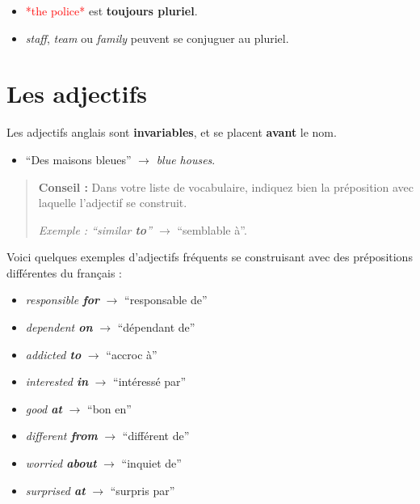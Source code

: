\documentclass[
  10pt,
]{article}
\providecommand{\tightlist}{%
  \setlength{\itemsep}{0pt}\setlength{\parskip}{0pt}}
\begin{document}
\begin{itemize}
\tightlist
\item
  \textcolor{red}{*the police*} est \textbf{toujours pluriel}.
\item
  \emph{staff}, \emph{team} ou \emph{family} peuvent se conjuguer au pluriel.
\end{itemize}

\hypertarget{les-adjectifs}{%
\section{Les adjectifs}\label{les-adjectifs}}

Les adjectifs anglais sont \textbf{invariables}, et se placent \textbf{avant} le nom.

\begin{itemize}
\tightlist
\item
  ``Des maisons bleues'' \(\rightarrow\) \emph{blue houses}.
\end{itemize}

\begin{quote}
\textbf{Conseil :} Dans votre liste de vocabulaire, indiquez bien la préposition avec laquelle l'adjectif se construit.

\emph{Exemple : ``similar \textbf{to}'' \(\rightarrow\)} ``semblable à''.
\end{quote}

Voici quelques exemples d'adjectifs fréquents se construisant avec des prépositions différentes du français :

\begin{itemize}
\tightlist
\item
  \emph{responsible \textbf{for}} \(\rightarrow\) ``responsable de''
\item
  \emph{dependent \textbf{on}} \(\rightarrow\) ``dépendant de''
\item
  \emph{addicted \textbf{to}} \(\rightarrow\) ``accroc à''
\item
  \emph{interested \textbf{in}} \(\rightarrow\) ``intéressé par''
\item
  \emph{good \textbf{at}} \(\rightarrow\) ``bon en''
\item
  \emph{different \textbf{from}} \(\rightarrow\) ``différent de''
\item
  \emph{worried \textbf{about}} \(\rightarrow\) ``inquiet de''
\item
  \emph{surprised \textbf{at}} \(\rightarrow\) ``surpris par''
\end{itemize}
\end{document}

